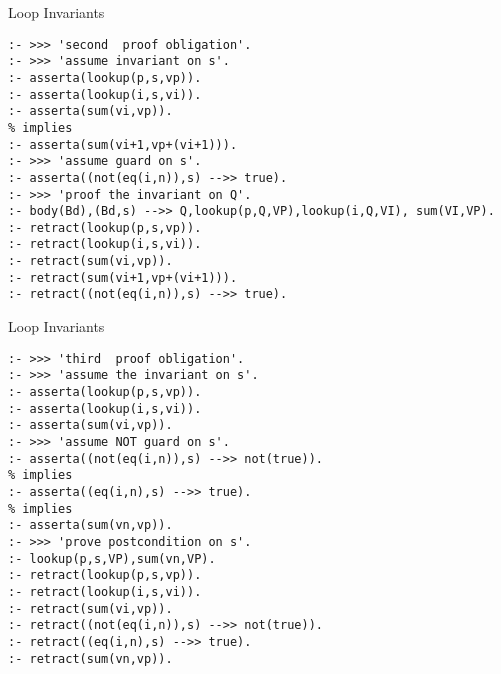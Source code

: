 \documentclass{beamer}
\begin{document}
\begin{frame}[fragile]{Loop Invariants}

{\scriptsize
\begin{verbatim}
:- >>> 'second  proof obligation'.                                                                 
:- >>> 'assume invariant on s'.                                                                    
:- asserta(lookup(p,s,vp)).
:- asserta(lookup(i,s,vi)).                                                                        
:- asserta(sum(vi,vp)).                                                                            
% implies                                                                                          
:- asserta(sum(vi+1,vp+(vi+1))).                                                                   
:- >>> 'assume guard on s'.                                                                        
:- asserta((not(eq(i,n)),s) -->> true).
:- >>> 'proof the invariant on Q'.
:- body(Bd),(Bd,s) -->> Q,lookup(p,Q,VP),lookup(i,Q,VI), sum(VI,VP).
:- retract(lookup(p,s,vp)).                                                                        
:- retract(lookup(i,s,vi)).
:- retract(sum(vi,vp)).
:- retract(sum(vi+1,vp+(vi+1))).
:- retract((not(eq(i,n)),s) -->> true).
\end{verbatim}
}
\end{frame}

\begin{frame}[fragile]{Loop Invariants}

{\scriptsize
\begin{verbatim}
:- >>> 'third  proof obligation'.
:- >>> 'assume the invariant on s'.
:- asserta(lookup(p,s,vp)).                                                                        
:- asserta(lookup(i,s,vi)).
:- asserta(sum(vi,vp)).
:- >>> 'assume NOT guard on s'.
:- asserta((not(eq(i,n)),s) -->> not(true)).
% implies
:- asserta((eq(i,n),s) -->> true).
% implies
:- asserta(sum(vn,vp)).
:- >>> 'prove postcondition on s'.
:- lookup(p,s,VP),sum(vn,VP).
:- retract(lookup(p,s,vp)).                                                                        
:- retract(lookup(i,s,vi)).
:- retract(sum(vi,vp)).
:- retract((not(eq(i,n)),s) -->> not(true)).
:- retract((eq(i,n),s) -->> true).
:- retract(sum(vn,vp)).
\end{verbatim}
}
\end{frame}
\end{document}
